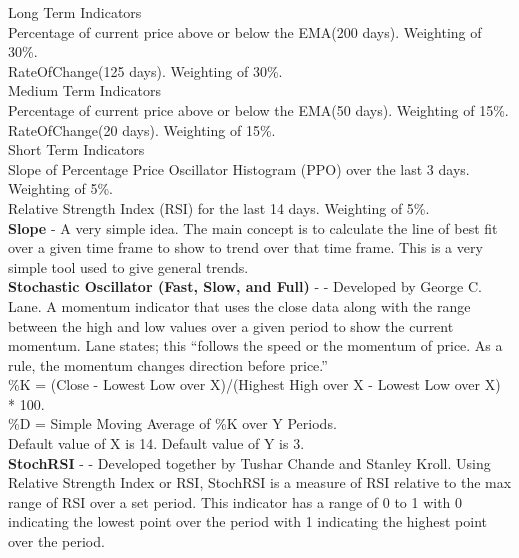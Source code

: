 \documentclass[12pt,a4paper]{article}
\begin{document}
\noindent
Long Term Indicators\\
Percentage of current price above or below the EMA(200 days). Weighting of 30\%. \\
RateOfChange(125 days). Weighting of 30\%. \\

\noindent
Medium Term Indicators\\
Percentage of current price above or below the EMA(50 days). Weighting of 15\%. \\
RateOfChange(20 days). Weighting of 15\%. \\

\noindent
Short Term Indicators\\
Slope of Percentage Price Oscillator Histogram (PPO) over the last 3 days. Weighting of 5\%. \\
Relative Strength Index (RSI) for the last 14 days. Weighting of 5\%. \\

\iffalse
[]
\fi

\noindent
\textbf{Slope} - A very simple idea. The main concept is to calculate the line of best fit over a given time frame to show to trend over that time frame. This is a very simple tool used to give general trends.\\

\iffalse
[]
\fi

\noindent
\textbf{Stochastic Oscillator (Fast, Slow, and Full)} - \cite{Murphy1999} - Developed by George C. Lane. A momentum indicator that uses the close data along with the range between the high and low values over a given period to show the current momentum. Lane states; this ``follows the speed or the momentum of price. As a rule, the momentum changes direction before price.'' \\

\noindent
\%K = (Close - Lowest Low over X)/(Highest High over X - Lowest Low over X) * 100.\\
\%D = Simple Moving Average of \%K over Y Periods. \\
Default value of X is 14. Default value of Y is 3.\\

\iffalse
[]
\fi

\noindent
\textbf{StochRSI} - \cite{Chande1994} - Developed together by Tushar Chande and Stanley Kroll. Using Relative Strength Index or RSI, StochRSI is a measure of RSI relative to the max range of RSI over a set period. This indicator has a range of 0 to 1 with 0 indicating the lowest point over the period with 1 indicating the highest point over the period.\\
\end{document}
